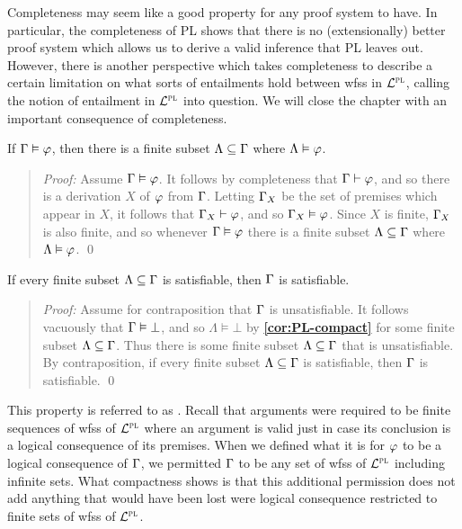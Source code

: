 Completeness may seem like a good property for any proof system to have.
In particular, the completeness of PL shows that there is no (extensionally) better proof system which allows us to derive a valid inference that PL leaves out.
However, there is another perspective which takes completeness to describe a certain limitation on what sorts of entailments hold between wfss in $\mathcal{L}^{\textsc{pl}}$, calling the notion of entailment in $\mathcal{L}^{\textsc{pl}}$ into question.
We will close the chapter with an important consequence of completeness.

\begin{Cthm} \label{cor:PL-compact}
  If $\Gamma\vDash\varphi$, then there is a finite subset $\Lambda\subseteq\Gamma$ where $\Lambda\vDash\varphi$.
\end{Cthm} \vspace{-.2in}

\begin{quote} 
  \textit{Proof:} 
  Assume $\Gamma\vDash\varphi$.  
  It follows by completeness that $\Gamma\vdash\varphi$, and so there is a derivation $X$ of $\varphi$ from $\Gamma$.
  Letting $\Gamma_X$ be the set of premises which appear in $X$, it follows that $\Gamma_X\vdash\varphi$, and so $\Gamma_X\vDash\varphi$.
  Since $X$ is finite, $\Gamma_X$ is also finite, and so whenever $\Gamma\vDash\varphi$ there is a finite subset $\Lambda\subseteq\Gamma$ where $\Lambda\vDash\varphi$.
  \qed
\end{quote}



\begin{Cthm}[Compactness] \label{cor:compact2}
  If every finite subset $\Lambda\subseteq\Gamma$ is satisfiable, then $\Gamma$ is satisfiable.
\end{Cthm} \vspace{-.2in}

\begin{quote} 
  \textit{Proof:} 
  Assume for contraposition that $\Gamma$ is unsatisfiable. 
  It follows vacuously that $\Gamma\vDash\bot$, and so $\Lambda\vDash\bot$ by \textbf{\ref{cor:PL-compact}} for some finite subset $\Lambda\subseteq\Gamma$.
  Thus there is some finite subset $\Lambda\subseteq\Gamma$ that is unsatisfiable. 
  By contraposition, if every finite subset $\Lambda\subseteq\Gamma$ is satisfiable, then $\Gamma$ is satisfiable. 
  \qed
\end{quote}


This property is referred to as .
Recall that arguments were required to be finite sequences of wfss of $\mathcal{L}^{\textsc{pl}}$ where an argument is valid just in case its conclusion is a logical consequence of its premises.
When we defined what it is for $\varphi$ to be a logical consequence of $\Gamma$, we permitted $\Gamma$ to be any set of wfss of $\mathcal{L}^{\textsc{pl}}$ including infinite sets. 
What compactness shows is that this additional permission does not add anything that would have been lost were logical consequence restricted to finite sets of wfss of $\mathcal{L}^{\textsc{pl}}$.

